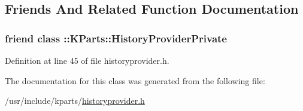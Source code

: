 \subsection{\-Friends \-And \-Related \-Function \-Documentation}
\hypertarget{classKParts_1_1HistoryProvider_aa6bf68e5e8d7a54d38811147d3243489}{
\subsubsection[{\-::\-K\-Parts\-::\-History\-Provider\-Private}]{\setlength{\rightskip}{0pt plus 5cm}friend class \-::\-K\-Parts\-::\-History\-Provider\-Private}}\label{classKParts_1_1HistoryProvider_aa6bf68e5e8d7a54d38811147d3243489}


\-Definition at line 45 of file historyprovider.\-h.



\-The documentation for this class was generated from the following file\-:\begin{DoxyCompactItemize}
\item 
/usr/include/kparts/\hyperlink{historyprovider_8h}{historyprovider.\-h}\end{DoxyCompactItemize}
